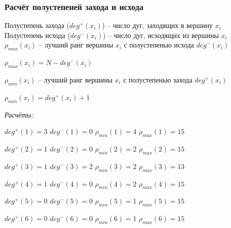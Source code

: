 \documentclass[14pt,fleqn]{extarticle}
\begin{document}
	\subsubsection*{Расчёт полустепеней захода и исхода}
	Полустепень захода ($deg^+(x_i)$) -- число дуг, заходящих в вершину $x_i$\\
	Полустепень исхода ($deg^-(x_i)$) -- число дуг, исходящих из вершины $x_i$\\
	
	$\rho_{max}(x_i)$ -- лучший ранг вершины $x_i$ с полустепенью исхода $deg^-(x_i)$
	\begin{center}
		$\rho_{max}(x_i) = N - deg^-(x_i)$
	\end{center}
	$\rho_{min}(x_i)$ -- лучший ранг вершины $x_i$ с полустепенью захода $deg^+(x_i)$
	\begin{center}
		$\rho_{min}(x_i) = deg^+(x_i) + 1$
	\end{center}

	\textit{Расчёты:}
	
	$deg^+(1) = 3$ \hspace{0.55cm} $deg^-(1) = 0$ \hspace{0.55cm} $\rho_{min}(1) = 4$ \hspace{0.55cm} $\rho_{max}(1) = 15$

	$deg^+(2) = 1$ \hspace{0.55cm} $deg^-(2) = 0$ \hspace{0.55cm} $\rho_{min}(2) = 2$ \hspace{0.55cm} $\rho_{max}(2) = 15$
	
	$deg^+(3) = 1$ \hspace{0.55cm} $deg^-(3) = 2$ \hspace{0.55cm} $\rho_{min}(3) = 2$ \hspace{0.55cm} $\rho_{max}(3) = 13$
	
	$deg^+(4) = 1$ \hspace{0.55cm} $deg^-(4) = 0$ \hspace{0.55cm} $\rho_{min}(4) = 2$ \hspace{0.55cm} $\rho_{max}(4) = 15$
	
	$deg^+(5) = 0$ \hspace{0.55cm} $deg^-(5) = 0$ \hspace{0.55cm} $\rho_{min}(5) = 1$ \hspace{0.55cm} $\rho_{max}(5) = 15$
	
	$deg^+(6) = 0$ \hspace{0.55cm} $deg^-(6) = 0$ \hspace{0.55cm} $\rho_{min}(6) = 1$ \hspace{0.55cm} $\rho_{max}(6) = 15$
	
\end{document}
